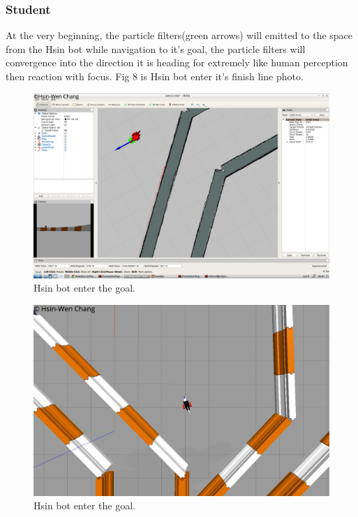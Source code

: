 \documentclass[10pt,journal,compsoc]{IEEEtran}
\begin{document}
\subsubsection{Student}
At the very beginning, the particle filters(green arrows) will emitted to the space from the Hsin bot while navigation to it's goal, the particle filters will convergence into the direction it is heading for extremely like human perception then reaction with focus.
 Fig 8 is Hsin bot enter it's finish line photo.
\begin{figure}[thpb]
      \centering
      \includegraphics[width=\linewidth]{rvizGoal.png}
      \caption{Hsin bot enter the goal.}
      \label{fig:robot1}
\end{figure}
\begin{figure}[thpb]
      \centering
      \includegraphics[width=\linewidth]{gazeboGoal.jpg}
      \caption{Hsin bot enter the goal.}
      \label{fig:robot1}
\end{figure}
\end{document}
